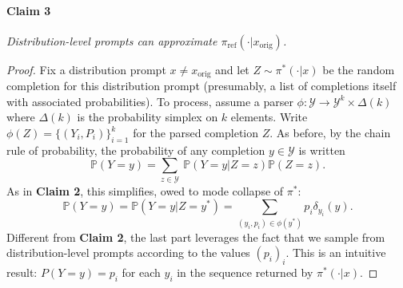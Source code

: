 \paragraph{Claim 3} \textit{Distribution-level prompts can approximate $\pi_\text{ref}(\cdot | x_\text{orig})$.}
\begin{proof}
Fix a distribution prompt $x \neq x_\text{orig}$ and let $Z \sim \pi^*(\cdot | x)$ be the random completion for this distribution prompt (presumably, a list of completions itself with associated probabilities). To process, assume a parser $\phi : \mathcal{Y} \to \mathcal{Y}^k \times \Delta(k)$ where $\Delta(k)$ is the probability simplex on $k$ elements. Write $\phi(Z) = \{(Y_i, P_i)\}_{i=1}^k$ for the parsed completion $Z$. As before, by the chain rule of probability, the probability of any completion $y \in \mathcal{Y}$ is written
\begin{equation}
    \mathbb{P}(Y = y) = \sum_{z \in \mathcal{Y}} \ \mathbb{P}(Y = y | Z = z)\mathbb{P}(Z = z).
\end{equation}
As in \textbf{Claim 2}, this simplifies, owed to mode collapse of $\pi^*$:
\begin{equation}
    \mathbb{P}(Y = y) = \mathbb{P}(Y = y | Z = y^*) = \sum_{(y_i,p_i) \in \phi(y^*)}  p_i\delta_{y_i}(y).
\end{equation}
Different from \textbf{Claim 2}, the last part leverages the fact that we sample from distribution-level prompts according to the values $(p_i)_i$. This is an intuitive result: $P(Y = y) = p_i$ for each $y_i$ in the sequence returned by $\pi^*(\cdot | x)$.


\end{proof}
